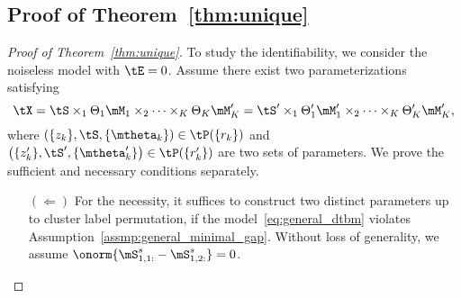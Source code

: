\documentclass[lettersize,onecolumn,journal]{IEEEtran}
\theoremstyle{definition}
\theoremstyle{definition}
\newcommand{\of}[1]{\left(#1\right)}
\begin{document}
\subsection{Proof of Theorem~\ref{thm:unique}}

\begin{proof}[Proof of Theorem~\ref{thm:unique}] 

To study the identifiability, we consider the noiseless model with $\tE = 0$. Assume there exist two parameterizations satisfying
\begin{equation}\label{eq:another}
    \tX=\tS\times_1\Theta_1 \mM_1 \times_2 \cdots \times_K \Theta_K \mM'_K=\tS'\times_1\Theta'_1 \mM'_1 \times_2 \cdots \times_K \Theta'_K \mM'_K,
\end{equation}
where $\of{ \{z_k\}, \tS, \{ \mtheta_k \} } \in \tP(\{r_k\})$ and $\of{ \{z'_k\}, \tS', \{ \mtheta'_k \} } \in \tP(\{r_k'\})$ are two sets of parameters. We prove the sufficient and necessary conditions separately.

\begin{enumerate}[wide]
    \item[$(\Leftarrow)$] For the necessity, it suffices to construct two distinct parameters up to cluster label permutation, if the model~\eqref{eq:general_dtbm} violates Assumption~\ref{assmp:general_minimal_gap}. Without loss of generality, we assume $\onorm{ \mS_{1,1:}^s - \mS_{1,2:}^s } = 0$.


\end{enumerate}
\end{proof}
\end{document}
